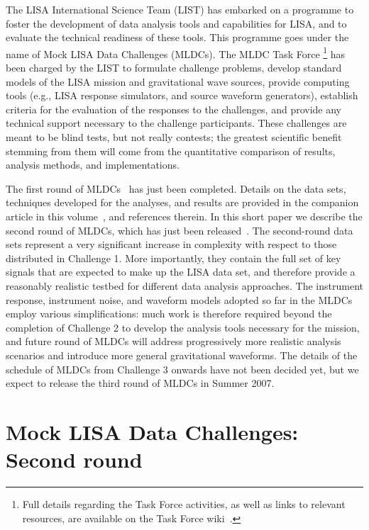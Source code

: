 \documentclass[12pt]{iopart}
\begin{document}
The LISA International Science Team (LIST) has embarked on a programme to foster the development of data analysis tools and capabilities for LISA, and to evaluate the technical readiness of these tools. This programme goes under the name of Mock LISA Data Challenges (MLDCs). The MLDC Task Force%
\footnote{Full details regarding the Task Force activities, as well as links to relevant resources, are available on the Task Force wiki~\cite{MLDCwiki}.}
% 
has been charged by the LIST to formulate challenge problems, develop standard models of the LISA mission and gravitational wave sources, provide computing tools (e.g., LISA response simulators, and source waveform generators), establish criteria for the evaluation of the responses to the challenges, and provide any technical support necessary to the challenge participants. These challenges are meant to be blind tests, but not really contests; the greatest scientific benefit stemming from them will come from the quantitative comparison of results, analysis methods, and implementations.

The first round of MLDCs~\cite{MLDCLISA06a,MLDCLISA06b} has just been completed. Details on the data sets, techniques developed for the analyses, and results are provided in the companion article in this volume~\cite{MLDC1-gwdaw}, and references therein. In this short paper we describe the second round of MLDCs, which has just been released~\cite{MLDCweb}. The second-round data sets represent a very significant increase in complexity with respect to those distributed in Challenge 1. More importantly, they contain the full set of key signals that are expected to make up the LISA data set, and therefore provide a reasonably realistic testbed for different data analysis approaches. The instrument response, instrument noise, and waveform models adopted so far in the MLDCs employ various simplifications: much work is therefore required beyond the completion of Challenge 2 to develop the analysis tools necessary for the mission, and future round of MLDCs will address progressively more realistic analysis scenarios and introduce more general gravitational waveforms. The details of the schedule of MLDCs from Challenge 3 onwards have not been decided yet, but we expect to release the third round of MLDCs in Summer 2007.

\section{Mock LISA Data Challenges: Second round}
\label{s:MLDC2}
\end{document}
